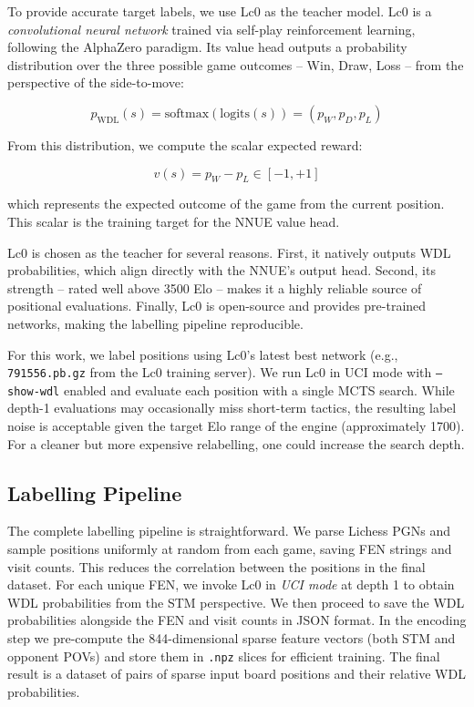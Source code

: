 To provide accurate target labels, we use Lc0 as the teacher model. Lc0 is a \emph{convolutional neural network} trained via self-play reinforcement learning, following the AlphaZero paradigm. Its value head outputs a probability distribution over the three possible game outcomes -- Win, Draw, Loss -- from the perspective of the side-to-move:

\[
p_{\text{WDL}}(s) = \text{softmax}(\text{logits}(s)) = (p_W, p_D, p_L)
\]

From this distribution, we compute the scalar expected reward:

\[
v(s) = p_W - p_L \in [-1, +1]
\]

which represents the expected outcome of the game from the current position. This scalar is the training target for the NNUE value head.

Lc0 is chosen as the teacher for several reasons. First, it natively outputs WDL probabilities, which align directly with the NNUE's output head. Second, its strength -- rated well above 3500 Elo -- makes it a highly reliable source of positional evaluations. Finally, Lc0 is open-source and provides pre-trained networks, making the labelling pipeline reproducible.

For this work, we label positions using Lc0's latest best network (e.g., \texttt{791556.pb.gz} from the Lc0 training server). We run Lc0 in UCI mode with \texttt{--show-wdl} enabled and evaluate each position with a single MCTS search. While depth-1 evaluations may occasionally miss short-term tactics, the resulting label noise is acceptable given the target Elo range of the engine (approximately 1700). For a cleaner but more expensive relabelling, one could increase the search depth.

\subsection{Labelling Pipeline}

The complete labelling pipeline is straightforward. We parse Lichess PGNs and sample positions uniformly at random from each game, saving FEN strings and visit counts. This reduces the correlation between the positions in the final dataset. For each unique FEN, we invoke Lc0 in \emph{UCI mode} at depth 1 to obtain WDL probabilities from the STM perspective. We then proceed to save the WDL probabilities alongside the FEN and visit counts in JSON format. In the encoding step we pre-compute the 844-dimensional sparse feature vectors (both STM and opponent POVs) and store them in \texttt{.npz} slices for efficient training. The final result is a dataset of pairs of sparse input board positions and their relative WDL probabilities.

